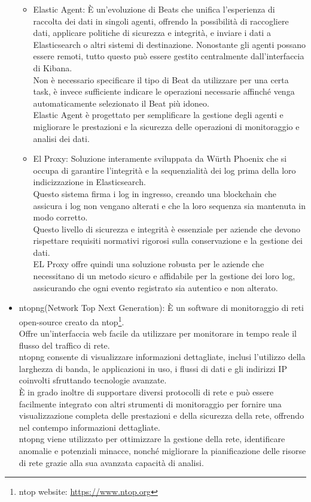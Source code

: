 \begin{itemize}
\begin{itemize}
      \item Elastic Agent: È un'evoluzione di Beats che unifica l'esperienza di
        raccolta dei dati in singoli agenti, offrendo la possibilità di raccogliere
        dati, applicare politiche di sicurezza e integrità, e inviare i dati a Elasticsearch
        o altri sistemi di destinazione. Nonostante gli agenti possano essere
        remoti, tutto questo può essere gestito centralmente dall'interfaccia di
        Kibana.\\ Non è necessario specificare il tipo di Beat da utilizzare per
        una certa task, è invece sufficiente indicare le operazioni necessarie
        affinché venga automaticamente selezionato il Beat più idoneo.\\ Elastic
        Agent è progettato per semplificare la gestione degli agenti e
        migliorare le prestazioni e la sicurezza delle operazioni di
        monitoraggio e analisi dei dati.

      \item El Proxy: Soluzione interamente sviluppata da Würth Phoenix che si
        occupa di garantire l'integrità e la sequenzialità dei log prima della
        loro indicizzazione in Elasticsearch.\\ Questo sistema firma i log in
        ingresso, creando una blockchain che assicura i log non vengano alterati
        e che la loro sequenza sia mantenuta in modo corretto.\\ Questo livello di
        sicurezza e integrità è essenziale per aziende che devono rispettare requisiti
        normativi rigorosi sulla conservazione e la gestione dei dati.\\ EL Proxy
        offre quindi una soluzione robusta per le aziende che necessitano di un metodo
        sicuro e affidabile per la gestione dei loro log, assicurando che ogni
        evento registrato sia autentico e non alterato.
    \end{itemize}

  \item ntopng(Network Top Next Generation): È un software di monitoraggio di reti
    open-source creato da ntop\footnote{ntop website: \url{https://www.ntop.org}}.\\
    Offre un'interfaccia web facile da utilizzare per monitorare in tempo reale
    il flusso del traffico di rete.\\ ntopng consente di visualizzare
    informazioni dettagliate, inclusi l'utilizzo della larghezza di banda, le
    applicazioni in uso, i flussi di dati e gli indirizzi IP coinvolti sfruttando
    tecnologie avanzate.\\ È in grado inoltre di supportare diversi protocolli di
    rete e può essere facilmente integrato con altri strumenti di monitoraggio per
    fornire una visualizzazione completa delle prestazioni e della sicurezza della
    rete, offrendo nel contempo informazioni dettagliate.\\ ntopng viene
    utilizzato per ottimizzare la gestione della rete, identificare anomalie e potenziali
    minacce, nonché migliorare la pianificazione delle risorse di rete grazie
    alla sua avanzata capacità di analisi.


\end{itemize}
